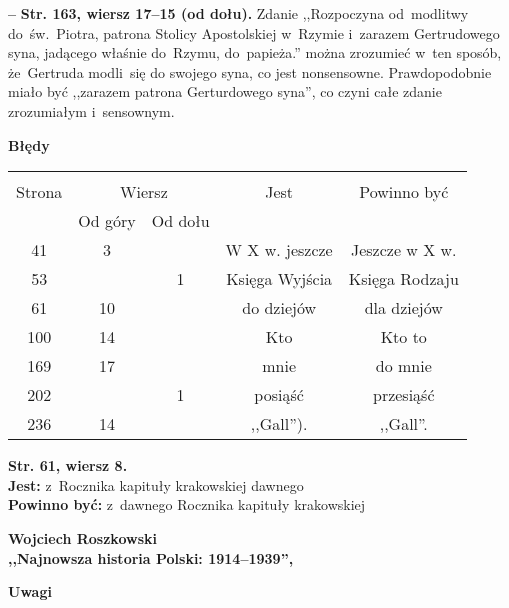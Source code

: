 \documentclass[a4paper,11pt]{article}
\newcommand{\spaceTwo}{2em}
\newcommand{\spaceFour}{0.5em}
\newcommand{\tb}{\textbf}
\newcommand{\noi}{\noindent}
\newcommand{\start}{\noi \tb{--} {}}
\newcommand{\Center}[1]{\begin{center} #1 \end{center}}
\newcommand{\CenterTB}[1]{\Center{\tb{#1}}}
\newcommand{\StrWg}[2]{\tb{Str. #1, wiersz #2.}}
\newcommand{\StrWd}[2]{\tb{Str. #1, wiersz #2 (od dołu).}}
\newcommand{\Jest}{\tb{Jest: }}
\newcommand{\Pow}{\tb{Powinno być: }}
\newcommand{\Work}[1]{ \begin{center} {\large \tb{#1}} \end{center} }
\begin{document}
\vspace{\spaceFour}


\start \StrWd{163}{17--15} Zdanie ,,Rozpoczyna od~modlitwy
do~św.~Piotra, patrona Stolicy Apostolskiej w~Rzymie i~zarazem
Gertrudowego syna, jadącego właśnie do~Rzymu, do~papieża.'' można
zrozumieć w~ten sposób, że~Gertruda modli~się do swojego syna, co jest
nonsensowne. Prawdopodobnie miało być ,,zarazem patrona Gerturdowego
syna'', co czyni całe zdanie zrozumiałym i~sensownym.


\CenterTB{Błędy}
\begin{center}
  \begin{tabular}{|c|c|c|c|c|}
    \hline
    & \multicolumn{2}{c|}{} & & \\
    Strona & \multicolumn{2}{c|}{Wiersz}& Jest & Powinno być \\ \cline{2-3}
    & Od góry & Od dołu &  &  \\ \hline
    41  & 3 & & W X w. jeszcze & Jeszcze w X w. \\
    53  & & 1 & Księga Wyjścia & Księga Rodzaju \\
    61  & 10 & & do dziejów & dla dziejów \\
    100 & 14 & & Kto & Kto to \\
    169 & 17 & & mnie & do mnie \\
    202 & & 1 & posiąść & przesiąść \\
    236 & 14 & & ,,Gall''). & ,,Gall''. \\
    \hline
  \end{tabular}
\end{center}
\noi
\StrWg{61}{8} \\
\Jest z~Rocznika kapituły krakowskiej dawnego \\
\Pow  z~dawnego Rocznika kapituły krakowskiej \\

\vspace{\spaceTwo}





\newpage

\Work{
  Wojciech Roszkowski \\
  ,,Najnowsza historia Polski: 1914--1939'',
  \cite{RoszkowskiNajnowszaHistoriaPolski39-45Wyd11} }


\CenterTB{Uwagi}
\end{document}
